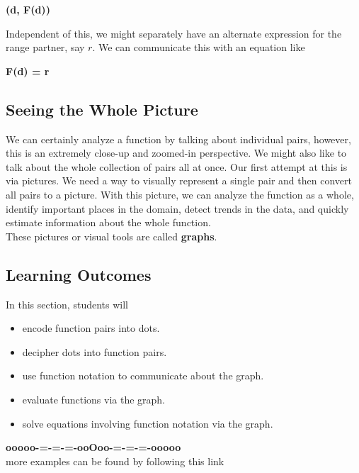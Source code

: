 \documentclass{ximera}
\begin{document}
\begin{center}
\textbf{\textcolor{purple!85!blue}{(d, F(d))}}
\end{center}




Independent of this, we might separately have an alternate expression for the range partner, say $r$.  We can communicate this with an equation like




\begin{center}
\textbf{\textcolor{purple!85!blue}{F(d) = r}}
\end{center}


\subsection{Seeing the Whole Picture}

We can certainly analyze a function by talking about individual pairs, however, this is an extremely close-up and zoomed-in perspective. We might also like to talk about the whole collection of pairs all at once.  Our first attempt at this is via pictures. We need a way to visually represent a single pair and then convert all pairs to a picture.  With this picture, we can analyze the function as a whole, identify important places in the domain, detect trends in the data, and quickly estimate information about the whole function. \\

These pictures or visual tools are called \textbf{\textcolor{blue!55!black}{graphs}}. \\






\subsection{Learning Outcomes}

\begin{sectionOutcomes}
In this section, students will 

\begin{itemize}
\item encode function pairs into dots.
\item decipher dots into function pairs.
\item use function notation to communicate about the graph.
\item evaluate functions via the graph.
\item solve equations involving function notation via the graph.
\end{itemize}
\end{sectionOutcomes}











\begin{center}
\textbf{\textcolor{green!50!black}{ooooo-=-=-=-ooOoo-=-=-=-ooooo}} \\

more examples can be found by following this link\\ 

\end{center}
\end{document}
